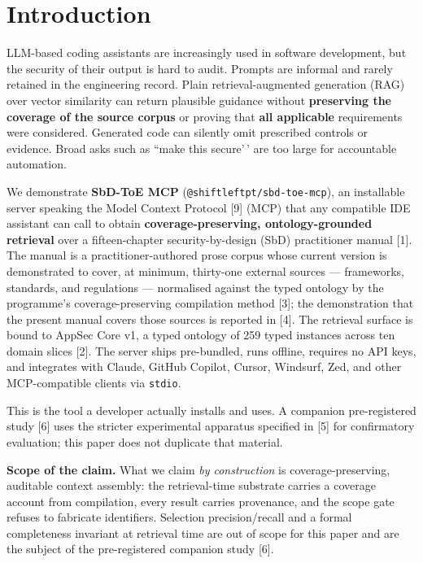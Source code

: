 \documentclass[conference]{IEEEtran}
\begin{document}
\section{Introduction}\label{introduction}

LLM-based coding assistants are increasingly used in software
development, but the security of their output is hard to audit. Prompts
are informal and rarely retained in the engineering record. Plain
retrieval-augmented generation (RAG) over vector similarity can return
plausible guidance without \textbf{preserving the coverage of the source
corpus} or proving that \textbf{all applicable} requirements were
considered. Generated code can silently omit prescribed controls or
evidence. Broad asks such as ``make this secure'\,' are too large for
accountable automation.

We demonstrate \textbf{SbD-ToE MCP} (\texttt{@shiftleftpt/sbd-toe-mcp}),
an installable server speaking the Model Context Protocol {[}9{]} (MCP)
that any compatible IDE assistant can call to obtain
\textbf{coverage-preserving, ontology-grounded retrieval} over a
fifteen-chapter security-by-design (SbD) practitioner manual {[}1{]}.
The manual is a practitioner-authored prose corpus whose current version
is demonstrated to cover, at minimum, thirty-one external sources ---
frameworks, standards, and regulations --- normalised against the typed
ontology by the programme's coverage-preserving compilation method
{[}3{]}; the demonstration that the present manual covers those sources
is reported in {[}4{]}. The retrieval surface is bound to AppSec Core
v1, a typed ontology of 259 typed instances across ten domain slices
{[}2{]}. The server ships pre-bundled, runs offline, requires no API
keys, and integrates with Claude, GitHub Copilot, Cursor, Windsurf, Zed,
and other MCP-compatible clients via \texttt{stdio}.

This is the tool a developer actually installs and uses. A companion
pre-registered study {[}6{]} uses the stricter experimental apparatus
specified in {[}5{]} for confirmatory evaluation; this paper does not
duplicate that material.

\textbf{Scope of the claim.} What we claim \emph{by construction} is
coverage-preserving, auditable context assembly: the retrieval-time
substrate carries a coverage account from compilation, every result
carries provenance, and the scope gate refuses to fabricate identifiers.
Selection precision/recall and a formal completeness invariant at
retrieval time are out of scope for this paper and are the subject of
the pre-registered companion study {[}6{]}.
\end{document}
